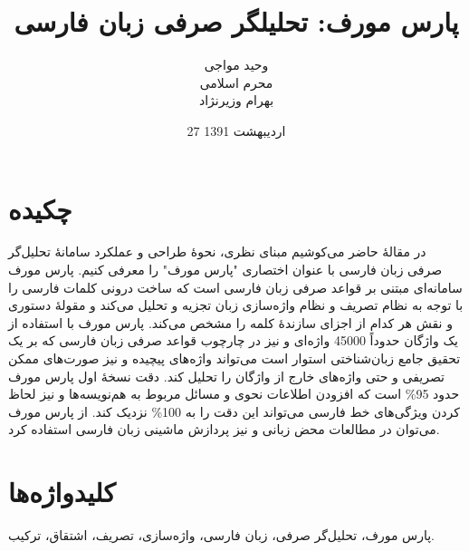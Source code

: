 \documentclass[12pt,onecolumn,a4paper]{article}
\begin{document}
    \title{پارس مورف: تحلیلگر صرفی زبان فارسی}
    \author{
    وحید مواجی\\
    محرم اسلامی\\
    بهرام وزیرنژاد
    }
    \date{27 اردیبهشت 1391}
    \maketitle

    \section{چکیده}
    در مقالهٔ حاضر می‌کوشیم مبنای نظری، نحوهٔ طراحی و عملکرد سامانهٔ تحلیل‌گر صرفی زبان فارسی با عنوان اختصاری "پارس مورف" را معرفی کنیم. پارس مورف سامانه‌ای مبتنی بر قواعد صرفی زبان فارسی است که ساخت درونی کلمات فارسی را با توجه به نظام تصریف و نظام واژه‌سازی زبان تجزیه و تحلیل می‌کند و مقولهٔ دستوری و نقش هر کدام از اجزای سازندهٔ کلمه را مشخص می‌کند. پارس مورف با استفاده از یک واژگان حدوداً 45000 واژه‌‌ای و نیز در چارچوب قواعد صرفی زبان فارسی که بر یک تحقیق جامع زبان‌شناختی استوار است می‌تواند واژه‌های پیچیده و نیز صورت‌های ممکن تصریفی و حتی واژه‌های خارج از واژگان را تحلیل کند.
    دقت نسخهٔ اول پارس مورف حدود 95\% است که افزودن اطلاعات نحوی و مسائل مربوط به هم‌نویسه‌ها و نیز لحاظ کردن ویژگی‌های خط فارسی می‌تواند این دقت را به 100\% نزدیک کند. از پارس مورف می‌توان در مطالعات محض زبانی و نیز پردازش ماشینی زبان فارسی استفاده کرد.

    \section{کلیدواژه‌ها}
    پارس مورف، تحلیل‌گر صرفی، زبان فارسی، واژه‌سازی، تصریف، اشتقاق، ترکیب.
\end{document}
